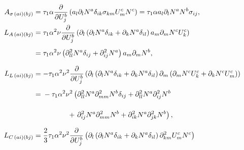 \begin{align}
  A_{\sigma\, (ai)(bj)}   & = \tau_1 \alpha \frac{\partial }{\partial U_j^b} \left( a_l \partial_l N^a \delta_{ik} \sigma_{km} U_m^c N^c \right) = \tau_1 \alpha a_l \partial_l N^a N^b \sigma_{ij},  \label{eq:ASigmaLHSStabilizationTerm}                                                                                               \\
  L_{A\, (ai)(bj)}        & = \tau_1 \alpha^2 \nu \frac{\partial }{\partial U_j^b} \left( \partial_l \left( \partial_l N^a \delta_{ik} + \partial_k N^a \delta_{il} \right) a_m \partial_m N^c U_k^c \right) \notag                                                                                                                       \\
                          & \vphantom{\frac{\partial }{\partial U_j^b}} = \tau_1 \alpha^2 \nu \left( \partial^2_{ll}N^a \delta_{ij} + \partial^2_{ij} N^a \right) a_m \partial_m N^b, \label{eq:LALHSStabilizationTerm}                                                                                                                   \\
  L_{L\, (ai)(bj)}        & = - \tau_1 \alpha^2 \nu^2 \frac{\partial }{\partial U_j^b} \left( \partial_l \left(\partial_l N^a \delta_{ik} + \partial_k N^a \delta_{il} \right) \partial_m \left( \partial_m N^c U_k^c + \partial_k N^c U_m^c \right) \right) \notag                                                                       \\
                          & =\vphantom{\frac{\partial }{\partial U_j^b}} - \tau_1 \alpha^2 \nu^2 \left( \partial^2_{ll}N^a \partial^2_{mm}N^b \delta_{ij} + \partial^2_{ll} N^a \partial^2_{ij}N^b \right. \notag                                                                                                                         \\
                          & \hphantom{{- \tau_1 \alpha^2 \nu^2}=}\vphantom{\frac{\partial }{\partial U_j^b}} + \left. \partial^2_{ij}N^a \partial^2_{mm} N^b + \partial^2_{ik} N^a \partial^2_{jk} N^b \right), \label{eq:LLLHSStabilizationTerm}                                                                                         \\
  L_{C\, (ai)(bj)}        & = \frac{2}{3}\tau_1 \alpha^2 \nu^2 \frac{\partial }{\partial U_j^b} \left( \partial_l \left( \partial_l N^a \delta_{ik} + \partial_k N^a \delta_{il} \right) \partial^2_{km} U_m^c N^c \right) \notag                                                                                                         \\

\end{align}
